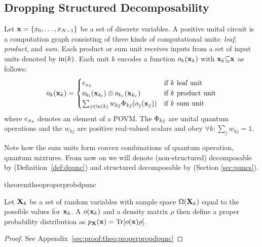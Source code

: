 \subsection{Dropping Structured Decomposability}
\label{sec:nonstructdecomp}











\begin{definition}
	\label{def:dpunc}
	Let   $\mathbf{x} = \{x_0, \allowbreak \dots ,\allowbreak x_{N{-}1}  \}$ be a set of discrete variables.
	A positive unital circuit is a computation graph consisting of three kinds of computational units:
	\textit{leaf}, \textit{product}, and \textit{sum}.
	Each product or sum unit receives inputs from a set of input units denoted by $\text{in}(k)$.
	Each unit $k$ encodes a function $o_{k}(\mathbf{x}_k)$ with $\mathbf{x}_k {\subseteq} \mathbf{x}$ as follows:
	\begin{align*}
		{\ensuremath{o}}_k(\mathbf{x}_k)=
		\begin{cases}
			e_{x_k}                                                           & \text{if $k$ leaf unit}    \\
			o_{k_l}(\mathbf{x}_{k_l}) \otimes o_{k_r}  (\mathbf{x}_{k_r}) & \text{if $k$ product unit} \\
			\sum_{j\in\text{in}(k)} w_{kj} \Phi_{kj} (o_j(\mathbf{x}_j) ) & \text{if $k$ sum unit}
		\end{cases}
	\end{align*}
	where $e_{x_k}$  denotes an element of a POVM. The $\Phi_{kj}$ are unital quantum operations and the $w_{kj}$ are positive real-valued scalars and obey $\forall k: \sum_j w_{kj} {=}1$.
\end{definition}


Note how the sum units form convex combinations of quantum operation, \ie quantum mixtures.
From now on we will denote (non-structured) decomposable \puncs by \dpuncs (\cf Definition~\ref{def:dpunc}) and structured decomposable \puncs by \sdpuncs (\cf Section \ref{sec:puncs}).



\begin{restatable}{theorem}{theoproperprobdpunc}
	\label{theo:properprobdpunc}

	Let $\mathbf{X}_k$ be a set of random variables with sample space $\Omega(\mathbf{X}_k)$ equal to the possible values for $\mathbf{x}_k$.
	A \dpunc $o(\mathbf{x}_k)$ and a density matrix $\rho$ then define a proper probability distribution as
	$
		p_{\mathbf{X}}(\mathbf{x}) = \Tr [o(\mathbf{x}) \rho]
		\label{eq:theo:prob_operator_nsd}
	$.
\end{restatable}
\begin{proof}
	See Appendix~\ref{sec:proof:theo:properpropdpunc}
\end{proof}





